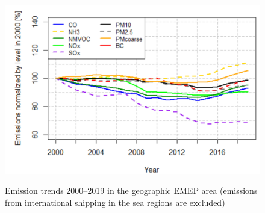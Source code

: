 \begin{figure}[b]
\centering
{\includegraphics*[viewport=1 1 565 370,clip,width=0.75\linewidth]{FIGS_CEIP/Fig8.pdf}}
\caption{Emission trends 2000--2019 in the geographic EMEP area (emissions from international shipping in the sea regions are excluded)}
\label{fig:CEIP8}
\end{figure}


